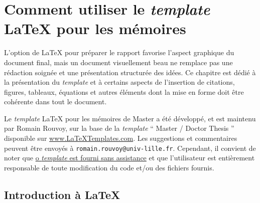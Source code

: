 
\chapter{Comment utiliser le \textit{template} \LaTeX{} pour les mémoires}	%
\label{Chapter2}	%


L'option de \LaTeX{} pour préparer le rapport favorise l'aspect graphique du document final, mais un document visuellement beau ne remplace pas une rédaction soignée et une présentation structurée des idées. Ce chapitre est dédié à la présentation du \textit{template} et à certains aspects de l'insertion de citations, figures, tableaux, équations et autres éléments dont la mise en forme doit être cohérente dans tout le document.

Le \textit{template} \LaTeX{} pour les mémoires de Master a été développé, et est maintenu par Romain Rouvoy, sur la base de la \textit{template} `` Master / Doctor Thesis '' disponible sur \url{www.LaTeXTemplates.com}. Les suggestions et commentaires peuvent être envoyés à \verb|romain.rouvoy@univ-lille.fr|. Cependant, il convient de noter que \underline{o \textit{template} est fourni sans assistance} et que l'utilisateur est entièrement responsable de toute modification du code et/ou des fichiers fournis.

\begin{comment}
L'environnement de commentaire est utilisé pour commenter facilement de grandes sections de code LateX. L'environnement de commentaire est utilisé pour commenter facilement de grandes sections de code LateX. L'environnement de commentaire est utilisé pour commenter facilement de grandes sections de code LateX. L'environnement de commentaire est utilisé pour commenter facilement de grandes sections de code LateX. L'environnement de commentaire est utilisé pour commenter facilement de grandes sections de code LateX.
\end{comment}


\section{Introduction à \LaTeX{}}
\label{sec:Ch2.1}

